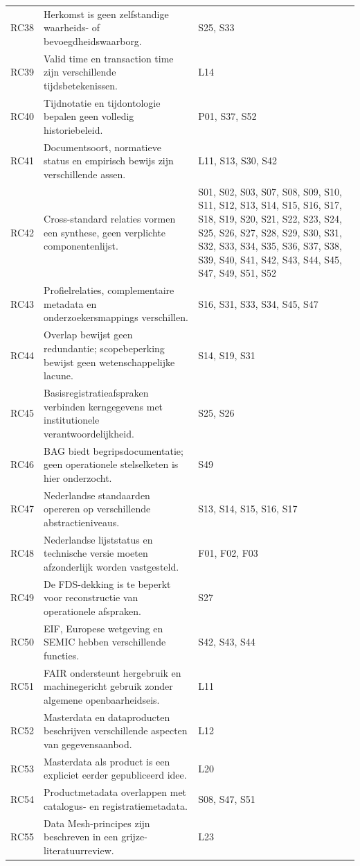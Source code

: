 \begin{longtable}{@{}P{.09\linewidth}P{.59\linewidth}P{.24\linewidth}@{}}
RC38 & Herkomst is geen zelfstandige waarheids- of bevoegdheidswaarborg. & S25, S33 \\
RC39 & Valid time en transaction time zijn verschillende tijdsbetekenissen. & L14 \\
RC40 & Tijdnotatie en tijdontologie bepalen geen volledig historiebeleid. & P01, S37, S52 \\
RC41 & Documentsoort, normatieve status en empirisch bewijs zijn verschillende assen. & L11, S13, S30, S42 \\
RC42 & Cross-standard relaties vormen een synthese, geen verplichte componentenlijst. & S01, S02, S03, S07, S08, S09, S10, S11, S12, S13, S14, S15, S16, S17, S18, S19, S20, S21, S22, S23, S24, S25, S26, S27, S28, S29, S30, S31, S32, S33, S34, S35, S36, S37, S38, S39, S40, S41, S42, S43, S44, S45, S47, S49, S51, S52 \\
RC43 & Profielrelaties, complementaire metadata en onderzoekersmappings verschillen. & S16, S31, S33, S34, S45, S47 \\
RC44 & Overlap bewijst geen redundantie; scopebeperking bewijst geen wetenschappelijke lacune. & S14, S19, S31 \\
RC45 & Basisregistratieafspraken verbinden kerngegevens met institutionele verantwoordelijkheid. & S25, S26 \\
RC46 & BAG biedt begripsdocumentatie; geen operationele stelselketen is hier onderzocht. & S49 \\
RC47 & Nederlandse standaarden opereren op verschillende abstractieniveaus. & S13, S14, S15, S16, S17 \\
RC48 & Nederlandse lijststatus en technische versie moeten afzonderlijk worden vastgesteld. & F01, F02, F03 \\
RC49 & De FDS-dekking is te beperkt voor reconstructie van operationele afspraken. & S27 \\
RC50 & EIF, Europese wetgeving en SEMIC hebben verschillende functies. & S42, S43, S44 \\
RC51 & FAIR ondersteunt hergebruik en machinegericht gebruik zonder algemene openbaarheidseis. & L11 \\
RC52 & Masterdata en dataproducten beschrijven verschillende aspecten van gegevensaanbod. & L12 \\
RC53 & Masterdata als product is een expliciet eerder gepubliceerd idee. & L20 \\
RC54 & Productmetadata overlappen met catalogus- en registratiemetadata. & S08, S47, S51 \\
RC55 & Data Mesh-principes zijn beschreven in een grijze-literatuurreview. & L23 \\

\end{longtable}
